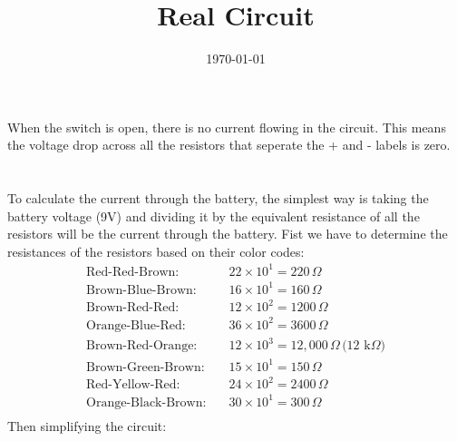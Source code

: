 \documentclass{article}
\begin{document}
\title{Real Circuit}
\author{}
\date{\today}

\maketitle

\section{}
When the switch is open, there is no current flowing in the circuit.
This means the voltage drop across all the resistors that seperate the + and -
labels is zero.

\section{}
To calculate the current through the battery, the simplest way is taking the
battery voltage (9V) and dividing it by the equivalent resistance of all the
resistors will be the current through the battery.
\newline
\newline
Fist we have to determine the resistances of the resistors based on their color codes:
\begin{align*}
    \text{Red-Red-Brown:} \quad & 22 \times 10^1 = 220 \, \Omega \\
    \text{Brown-Blue-Brown:} \quad & 16 \times 10^1 = 160 \, \Omega \\
    \text{Brown-Red-Red:} \quad & 12 \times 10^2 = 1200 \, \Omega \\
    \text{Orange-Blue-Red:} \quad & 36 \times 10^2 = 3600 \, \Omega \\
    \text{Brown-Red-Orange:} \quad & 12 \times 10^3 = 12,000 \, \Omega \, \text{(12 k}\Omega\text{)} \\
    \text{Brown-Green-Brown:} \quad & 15 \times 10^1 = 150 \, \Omega \\
    \text{Red-Yellow-Red:} \quad & 24 \times 10^2 = 2400 \, \Omega \\
    \text{Orange-Black-Brown:} \quad & 30 \times 10^1 = 300 \, \Omega \\
\end{align*}
\newpage
Then simplifying the circuit:
\newline
\end{document}
